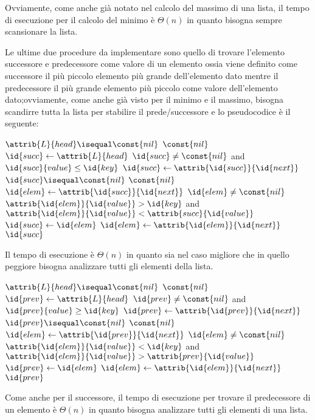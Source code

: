 Ovviamente, come anche già notato nel calcolo del massimo di una lista, il tempo di
esecuzione per il calcolo del minimo è $\Theta(n)$ in quanto bisogna sempre scansionare la lista.

Le ultime due procedure da implementare sono quello di trovare l'elemento successore
e predecessore come valore di un elemento ossia viene definito come successore il più
piccolo elemento più grande dell'elemento dato mentre il predecessore il più grande
elemento più piccolo come valore dell'elemento dato;ovviamente, come anche già visto
per il minimo e il massimo, bisogna scandirre tutta la lista per stabilire il prede/successore
e lo pseudocodice è il seguente:
\begin{codebox}
\li \If $\attrib{L}{head} \isequal \const{nil}$
    \Then
\li                \Return $\const{nil}$
\li $\id{succ} \gets \attrib{L}{head}$
\li \While $\id{succ} \neq \const{nil}$ and $\id{succ}{value} \leq \id{key}$
    \Do
           $\id{succ} \gets \attrib{\id{succ}}{\id{next}}$
    \End
\li \If $\id{succ} \isequal \const{nil}$ \Return $\const{nil}$
\li $\id{elem} \gets \attrib{\id{succ}}{\id{next}}$
\li \While $\id{elem} \neq \const{nil}$
    \Do
\li      \If $\attrib{\id{elem}}{\id{value}} > \id{key}$ and $\attrib{\id{elem}}{\id{value}} < \attrib{succ}{\id{value}}$
         \Then
\li                              $\id{succ} \gets \id{elem}$
         \End
\li      $\id{elem} \gets \attrib{\id{elem}}{\id{next}}$
    \End
\li \Return $\id{succ}$
\end{codebox}
Il tempo di esecuzione è $\Theta(n)$ in quanto sia nel caso migliore che in quello
peggiore bisogna analizzare tutti gli elementi della lista.

\begin{codebox}
\li \If $\attrib{L}{head} \isequal \const{nil}$
    \Then
\li                \Return $\const{nil}$
\li $\id{prev} \gets \attrib{L}{head}$
\li \While $\id{prev} \neq \const{nil}$ and $\id{prev}{value} \geq \id{key}$
    \Do
           $\id{prev} \gets \attrib{\id{prev}}{\id{next}}$
    \End
\li \If $\id{prev} \isequal \const{nil}$ \Return $\const{nil}$
\li $\id{elem} \gets \attrib{\id{prev}}{\id{next}}$
\li \While $\id{elem} \neq \const{nil}$
    \Do
\li      \If $\attrib{\id{elem}}{\id{value}} < \id{key}$ and $\attrib{\id{elem}}{\id{value}} > \attrib{prev}{\id{value}}$
         \Then
\li                              $\id{prev} \gets \id{elem}$
         \End
\li      $\id{elem} \gets \attrib{\id{elem}}{\id{next}}$
    \End
\li \Return $\id{prev}$
\end{codebox}
Come anche per il successore, il tempo di esecuzione per trovare il predecessore di
un elemento è $\Theta(n)$ in quanto bisogna analizzare tutti gli elementi di una lista.

